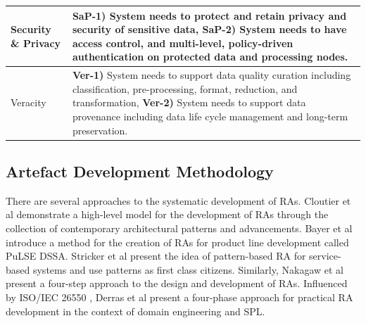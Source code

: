 \documentclass[conference]{IEEEtran}
\begin{document}
\begin{table}[h]
\begin{tabular}{|m{1.2cm}|m{16cm}|}
        \hline

        Security \& Privacy & 
        
        \textbf{SaP-1)} System needs to protect and retain privacy and security of sensitive data, \textbf{SaP-2)} System needs to have access control, and multi-level, policy-driven authentication on protected data and processing nodes. 
        \\

        \hline
        
        Veracity &
        
        \textbf{Ver-1)} System needs to support data quality curation including classification, pre-processing, format, reduction, and  transformation, \textbf{Ver-2)} System needs to support data provenance including data life cycle management and long-term preservation.
        \\
        \hline
  
    \end{tabular}
    \label{table-requirements}
    \end{table}


\subsection{Artefact Development Methodology}
There are several approaches to the systematic development of RAs. Cloutier et al \cite{Cloutier} demonstrate a high-level model for the development of RAs through the collection of contemporary architectural patterns and advancements. Bayer et al \cite{bayer1999pulse} introduce a method for the creation of RAs for product line development called PuLSE DSSA. Stricker et al \cite{stricker2010creating} present the idea of pattern-based RA for service-based systems and use patterns as first class citizens. Similarly, Nakagaw et al \cite{nakagawa2014consolidating} present a four-step approach to the design and development of RAs. Influenced by ISO/IEC 26550 \cite{wg2015iso}, Derras et al \cite{Derras} present a four-phase approach for practical RA development in the context of domain engineering and SPL.

\end{document}

